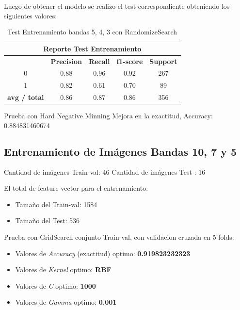 Luego de obtener el modelo se realizo el test correspondiente obteniendo los siguientes valores:
\begin{table}[H]
\begin{center}
\begin{tabular}{|c|c|c|c|c|}
\hline \multicolumn{5}{|c|}{Reporte Test Entrenamiento} \\ \hline
\hline \textbf{} & \textbf{Precision} & \textbf{Recall} & \textbf{f1-score} & \textbf{Support}\\ \hline 
				 0   & 0.88 & 0.96 & 0.92  & 267	\\ \hline 
				 1   & 0.82 & 0.61 & 0.70  & 89 \\ \hline 
\textbf{avg / total} & 0.86 & 0.87 & 0.86  & 356 \\ \hline
\end{tabular}
\end{center} \caption{Test Entrenamiento bandas 5, 4, 3 con RandomizeSearch}\label{tab:RandomTest543}
\end{table}


Prueba con Hard Negative Minning
Mejora en la exactitud, Accuracy: 0.884831460674



\subsection{Entrenamiento de Imágenes Bandas 10, 7 y 5}\label{sub:entrenamiento_bandas1075}

Cantidad de imágenes Train-val: 46 
Cantidad de imágenes Test : 16  

El total de feature vector para el entrenamiento:
\begin{itemize}
\item Tamaño del Train-val: 1584
\item Tamaño del Test: 536
\end{itemize}

Prueba con GridSearch conjunto Train-val, con validacion cruzada en 5 folds:

\begin{itemize}
\item Valores de \textit{Accuracy} (exactitud) optimo: \textbf{0.919823232323}
\item Valores de \textit{Kernel} optimo: \textbf{RBF}
\item Valores de \textit{C} optimo: \textbf{1000}
\item Valores de \textit{Gamma} optimo: \textbf{0.001}
\end{itemize}


